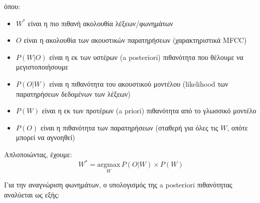 \documentclass[a4paper,12pt]{article}
\begin{document}
όπου:
\begin{itemize}
    \item $W^*$ είναι η πιο πιθανή ακολουθία λέξεων/φωνημάτων
    \item $O$ είναι η ακολουθία των ακουστικών παρατηρήσεων (χαρακτηριστικά MFCC)
    \item $P(W|O)$ είναι η εκ των υστέρων (a posteriori) πιθανότητα που θέλουμε να μεγιστοποιήσουμε
    \item $P(O|W)$ είναι η πιθανότητα του ακουστικού μοντέλου (likelihood των παρατηρήσεων δεδομένων των λέξεων)
    \item $P(W)$ είναι η εκ των προτέρων (a priori) πιθανότητα από το γλωσσικό μοντέλο
    \item $P(O)$ είναι η πιθανότητα των παρατηρήσεων (σταθερή για όλες τις $W$, οπότε μπορεί να αγνοηθεί)
\end{itemize}

Απλοποιώντας, έχουμε:
\begin{equation}
W^* = \underset{W}{\text{argmax}} \, P(O|W) \times P(W)
\end{equation}

Για την αναγνώριση φωνημάτων, ο υπολογισμός της a posteriori πιθανότητας αναλύεται ως εξής:
\end{document}
